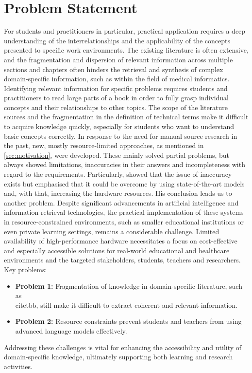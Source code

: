 \section{Problem Statement}\label{sec:problem statement}
For students and practitioners in particular, practical application requires a deep understanding of the interrelationships and the applicability of the concepts presented to specific work environments.
The existing literature is often extensive, and the fragmentation and dispersion of relevant information across multiple sections and chapters often hinders the retrieval and synthesis of complex domain-specific information, such as within the field of medical informatics.
Identifying relevant information for specific problems requires students and practitioners to read large parts of a book in order to fully grasp individual concepts and their relationships to other topics.
The scope of the literature sources and the fragmentation in the definition of technical terms make it difficult to acquire knowledge quickly, especially for students who want to understand basic concepts correctly.
%
In response to the need for manual source research in the past, new, mostly resource-limited approaches, as mentioned in \cref{sec:motivation}, were developed. 
These mainly solved partial problems, but always showed limitations, inaccuracies in their answers and incompleteness with regard to the requirements. 
%
Particularly, \citet{Paul_Keller} showed that the issue of inaccuracy exists but emphasised that it could be overcome by using state-of-the-art models and, with that, increasing the hardware resources. 
His conclusion leads us to another problem.   
Despite significant advancements in artificial intelligence and information retrieval technologies, the practical implementation of these systems in resource-constrained environments, such as smaller educational institutions or even private learning settings, remains a considerable challenge. 
Limited availability of high-performance hardware necessitates a focus on cost-effective and especially accessible solutions for real-world educational and healthcare environments and the targeted stakeholders, students, teachers and researchers.
%
Key problems:
\begin{itemize}
  \item \textbf{Problem 1:} Fragmentation of knowledge in domain-specific literature, such as \\citet{bb}, still make it difficult to extract coherent and relevant information.
  \item \textbf{Problem 2:} Resource constraints prevent students and teachers from using advanced language models effectively.
\end{itemize}
%
Addressing these challenges is vital for enhancing the accessibility and utility of domain-specific knowledge, ultimately supporting both learning and research activities. 


